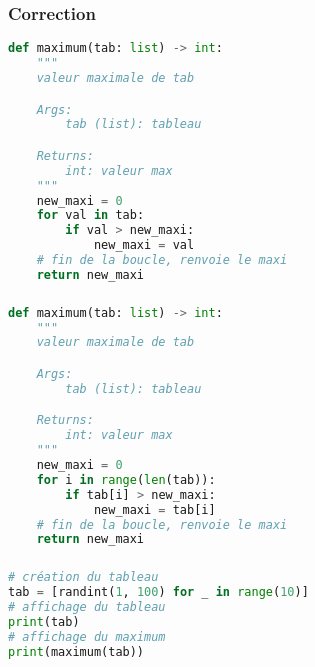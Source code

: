 \documentclass[svgnames,11pt]{beamer}
\begin{document}
\begin{frame}[fragile]
    \frametitle{Correction}

    \begin{center}
        \begin{lstlisting}[language=Python , basicstyle=\ttfamily\small, xleftmargin=2em, xrightmargin=2em]
def maximum(tab: list) -> int:
    """
    valeur maximale de tab

    Args:
        tab (list): tableau

    Returns:
        int: valeur max
    """
    new_maxi = 0
    for val in tab:
        if val > new_maxi:
            new_maxi = val
    # fin de la boucle, renvoie le maxi
    return new_maxi
\end{lstlisting}
        \label{CODE}
    \end{center}

\end{frame}
\begin{frame}[fragile]
    \frametitle{}

    \begin{center}
        \begin{lstlisting}[language=Python , basicstyle=\ttfamily\small, xleftmargin=2em, xrightmargin=2em]
def maximum(tab: list) -> int:
    """
    valeur maximale de tab

    Args:
        tab (list): tableau

    Returns:
        int: valeur max
    """
    new_maxi = 0
    for i in range(len(tab)):
        if tab[i] > new_maxi:
            new_maxi = tab[i]
    # fin de la boucle, renvoie le maxi
    return new_maxi
\end{lstlisting}
        \label{CODE}
    \end{center}

\end{frame}
\begin{frame}[fragile]
    \frametitle{}

    \begin{center}
        \begin{lstlisting}[language=Python , basicstyle=\ttfamily\small, xleftmargin=2em, xrightmargin=2em]
# création du tableau
tab = [randint(1, 100) for _ in range(10)]
# affichage du tableau
print(tab)
# affichage du maximum
print(maximum(tab))
\end{lstlisting}
        \label{CODE}
    \end{center}

\end{frame}
\end{document}
